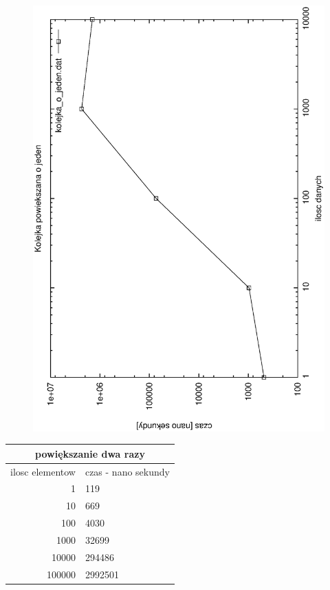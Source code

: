 \documentclass[a4paper,11pt]{report}
\begin{document}
\begin{figure}
  \begin{center}
    \includegraphics{wykresy/kolejka_o_jeden.eps}
    \caption{}
    \label{fig:}
  \end{center}
\end{figure}

\begin{tabular}{|rl|}
\hline
\multicolumn{2}{|c|}{powiększanie dwa razy}\\
\hline
ilosc elementow & czas - nano sekundy\\
\hline
1&119\\
10&669\\
100&4030\\
1000&32699\\
10000&294486\\
100000&2992501\\
\hline
\end{tabular}
\end{document}
